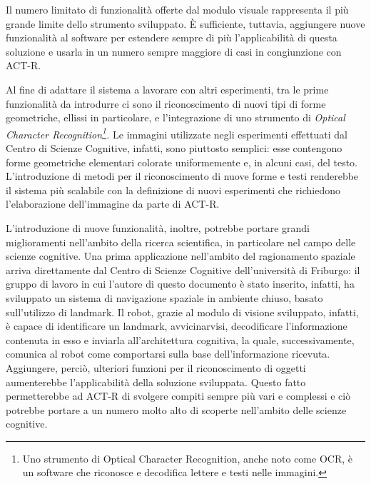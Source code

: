 		Il numero limitato di funzionalità offerte dal modulo visuale rappresenta il più grande limite dello strumento sviluppato. 
		È sufficiente, tuttavia, aggiungere nuove funzionalità al software per estendere sempre di più l'applicabilità di questa soluzione e usarla in un numero sempre maggiore di casi in congiunzione con \mbox{ACT-R}.

		Al fine di adattare il sistema a lavorare con altri esperimenti, tra le prime funzionalità da introdurre ci sono il riconoscimento di nuovi tipi di forme geometriche, ellissi in particolare, e l'integrazione di uno strumento di \emph{Optical Character Recognition\footnote{Uno strumento di Optical Character Recognition, anche noto come OCR, è un software che riconosce e decodifica lettere e testi nelle immagini.}.}
		Le immagini utilizzate negli esperimenti effettuati dal Centro di Scienze Cognitive, infatti, sono piuttosto semplici: esse contengono forme geometriche elementari colorate uniformemente e, in alcuni casi, del testo.
		L'introduzione di metodi per il riconoscimento di nuove forme e testi renderebbe il sistema più scalabile con la definizione di nuovi esperimenti che richiedono l'elaborazione dell'immagine da parte di \mbox{ACT-R}.

		L'introduzione di nuove funzionalità, inoltre, potrebbe portare grandi miglioramenti nell'ambito della ricerca scientifica, in particolare nel campo delle scienze cognitive.
		Una prima applicazione nell'ambito del ragionamento spaziale arriva direttamente dal Centro di Scienze Cognitive dell'università di Friburgo: il gruppo di lavoro in cui l'autore di questo documento è stato inserito, infatti, ha sviluppato un sistema di navigazione spaziale in ambiente chiuso, basato sull'utilizzo di landmark.
		Il robot, grazie al modulo di visione sviluppato, infatti, è capace di identificare un landmark, avvicinarvisi, decodificare l'informazione contenuta in esso e inviarla all'architettura cognitiva, la quale, successivamente, comunica al robot come comportarsi sulla base dell'informazione ricevuta.
		Aggiungere, perciò, ulteriori funzioni per il riconoscimento di oggetti aumenterebbe l'applicabilità della soluzione sviluppata.	
		Questo fatto permetterebbe ad \mbox{ACT-R} di svolgere compiti sempre più vari e complessi e ciò potrebbe portare a un numero molto alto di scoperte nell'ambito delle scienze cognitive.


